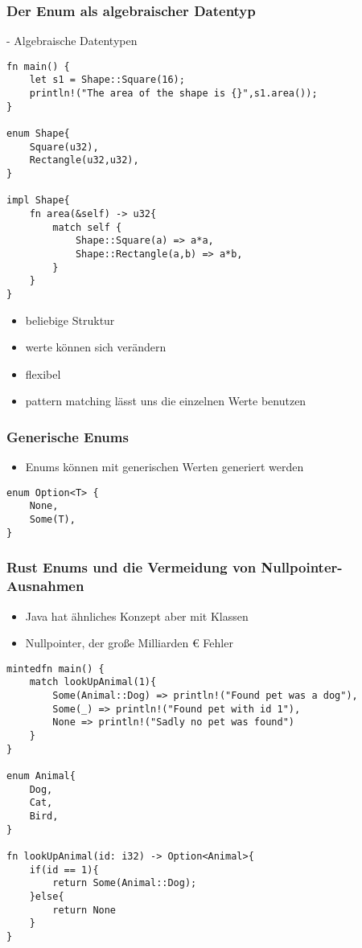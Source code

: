 \documentclass[a4paper, 1ppt]{article}
\begin{document}
\subsubsection{Der Enum als algebraischer Datentyp}
- Algebraische Datentypen
\begin{verbatim}
fn main() {
    let s1 = Shape::Square(16);
    println!("The area of the shape is {}",s1.area());
}

enum Shape{
    Square(u32),
    Rectangle(u32,u32),
}

impl Shape{
    fn area(&self) -> u32{
        match self {
            Shape::Square(a) => a*a,
            Shape::Rectangle(a,b) => a*b,
        }
    }
}
\end{verbatim}
\begin{itemize}
	\item beliebige Struktur
	\item werte können sich verändern
		\item flexibel
	\item pattern matching lässt uns die einzelnen Werte benutzen
\end{itemize}
\subsubsection{Generische Enums}
\begin{itemize}
	\item Enums können mit generischen Werten generiert werden
\end{itemize}
\begin{verbatim}
enum Option<T> {
	None,
	Some(T),
}
\end{verbatim}
\subsubsection{Rust Enums und die Vermeidung von Nullpointer-Ausnahmen}
\begin{itemize}
	\item Java hat ähnliches Konzept aber mit Klassen
	\item Nullpointer, der große Milliarden € Fehler
\end{itemize}
\begin{verbatim}
mintedfn main() {
    match lookUpAnimal(1){
        Some(Animal::Dog) => println!("Found pet was a dog"),
        Some(_) => println!("Found pet with id 1"),
        None => println!("Sadly no pet was found")
    }
}

enum Animal{
    Dog,
    Cat,
    Bird,
}

fn lookUpAnimal(id: i32) -> Option<Animal>{
    if(id == 1){
        return Some(Animal::Dog);
    }else{
        return None
    }
}
\end{verbatim}
\end{document}
